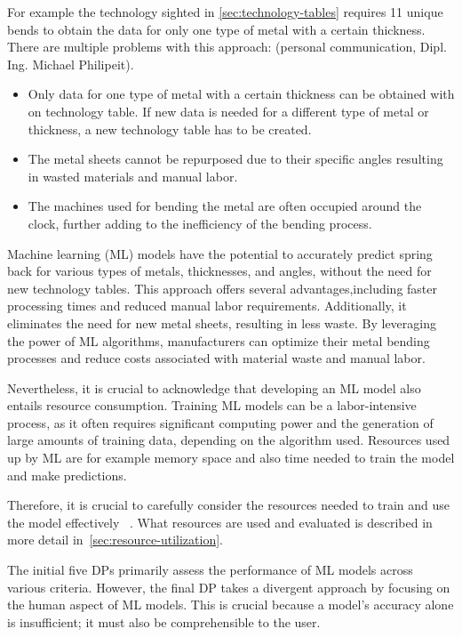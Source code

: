 {For example the technology sighted in \cref{sec:technology-tables} requires 11 unique bends to obtain the data
for only one type of metal with a certain thickness.
There are multiple problems with this approach: (personal communication, Dipl. Ing. Michael Philipeit).
\begin{itemize}
    \item Only data for one type of metal with a certain thickness can be obtained with on technology table. If new data
    is needed for a different type of metal or thickness, a new technology table has to be created.
    \item The metal sheets cannot be repurposed due to their specific angles resulting in wasted materials and manual
    labor.
    \item The machines used for bending the metal are often occupied around the clock, further adding to the
    inefficiency of the bending process.
\end{itemize}

Machine learning (\ac{ML}) models have the potential to accurately predict spring back for various types of metals,
thicknesses, and angles, without the need for new technology tables.
This approach offers several advantages,including faster processing times and reduced manual labor requirements.
Additionally, it eliminates the need for new metal sheets, resulting in less waste.
By leveraging the power of \ac{ML} algorithms, manufacturers can optimize
their metal bending processes and reduce costs associated with material waste and manual labor.

Nevertheless, it is crucial to acknowledge that developing an \ac{ML} model also entails resource consumption.
Training \ac{ML} models can be a labor-intensive process, as it often requires significant
computing power and the generation of large amounts of training data, depending on the algorithm used.
Resources used up by \ac{ML} are for example memory space and also time needed to train the model and make predictions.

Therefore, it is crucial to carefully consider the resources needed to train and use the model
effectively
~\cite[p. 16]{siebert2022construction}.
What resources are used and evaluated is described in more detail in~\ref{sec:resource-utilization}.

The initial five \ac{DP}s primarily assess the performance of \ac{ML} models across various criteria.
However, the final \ac{DP} takes a divergent approach by focusing on the human aspect of \ac{ML} models.
This is crucial because a model's accuracy alone is insufficient; it must also be comprehensible to the user.


}
